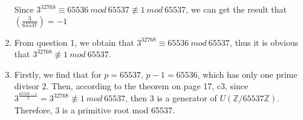 \documentclass[12pt, a4paper]{article}
\begin{document}
\begin{enumerate}
          Since $3^{32768} \equiv 65536\ mod\ 65537 \not\equiv 1\ mod\ 65537$, 
          we can get the result that $(\frac{3}{65537}) = -1$
    \item From question 1, we obtain that $3^{32768} \equiv 65536\ mod\ 65537$, 
          thus it is obvious that $3^{32768} \not\equiv 1\ mod\ 65537$.
    \item Firstly, we find that for $p = 65537$, $p-1 = 65536$, which has only one prime divisor 2. 
          Then, according to the theorem on page 17, c3, 
          since $3^{\frac{65537-1}{2}} = 3^{32768} \not\equiv 1\ mod\ 65537$, 
          then 3 is a generator of $U(\mathbb{Z}/65537\mathbb{Z})$. \newline
          Therefore, 3 is a primitive root mod 65537.
\end{enumerate}
\end{document}
